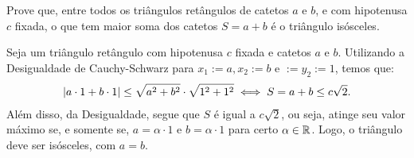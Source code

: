 \begin{example}
Prove que, entre todos os triângulos retângulos de catetos $a$ e $b$, e com hipotenusa $c$ fixada, o que tem maior soma dos catetos
$S = a+b$ é o triângulo isósceles.
\end{example}

\begin{solution}
Seja um triângulo retângulo com hipotenusa $c$ fixada e catetos $a$ e $b$. Utilizando a Desigualdade de Cauchy-Schwarz para $x_1 := a, x_2 := b$ e $ := y_2 := 1$, temos que:
%
\begin{align*}
\left|a \cdot 1 + b \cdot 1\right| \le \sqrt{a^2 + b^2} \cdot \sqrt{1^2 + 1^2} \iff S = a+b \le c\sqrt 2.
\end{align*}
%
Além disso, da Desigualdade, segue que $S$ é igual a $c\sqrt 2$, ou seja, atinge seu valor máximo se, e somente se, $a = \alpha \cdot 1$ e $b = \alpha \cdot 1$ para certo $\alpha \in \mathbb{R}$. Logo, o triângulo deve ser isósceles, com $a=b$.
\end{solution}